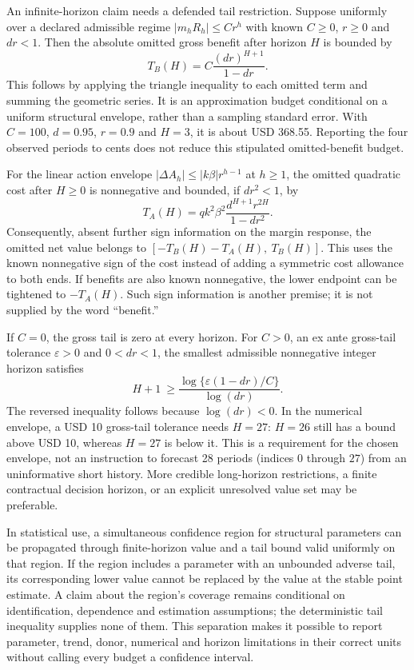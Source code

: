 An infinite-horizon claim needs a defended tail restriction. Suppose
uniformly over a declared admissible regime
$|m_hR_h|\leq C r^h$ with known $C\geq0$, $r\geq0$ and $dr<1$.
Then the absolute omitted gross benefit after horizon $H$ is bounded by
\begin{equation}
 T_B(H)=C\frac{(dr)^{H+1}}{1-dr}.
 \label{exec17:s6-tail-budget}
\end{equation}
This follows by applying the triangle inequality to each omitted term
and summing the geometric series. It is an approximation budget
conditional on a uniform structural envelope, rather than a sampling
standard error. With $C=100$, $d=0.95$, $r=0.9$ and $H=3$, it is
about USD 368.55. Reporting the four observed periods to cents does
not reduce this stipulated omitted-benefit budget.

For the linear action envelope
$|\Delta A_h|\leq |k\beta|r^{h-1}$ at $h\geq1$, the omitted
quadratic cost after $H\geq0$ is nonnegative and bounded, if $dr^2<1$,
by
\begin{equation}
 T_A(H)=qk^2\beta^2\frac{d^{H+1}r^{2H}}{1-dr^2}.
 \label{exec17:s6-action-tail}
\end{equation}
Consequently, absent further sign information on the margin response,
the omitted net value belongs to
$[-T_B(H)-T_A(H),\ T_B(H)]$. This uses the known nonnegative
sign of the cost instead of adding a symmetric cost allowance to both
ends. If benefits are also known nonnegative, the lower endpoint can
be tightened to $-T_A(H)$. Such sign information is another premise;
it is not supplied by the word ``benefit.''

If $C=0$, the gross tail is zero at every horizon. For $C>0$, an ex ante
gross-tail tolerance $\varepsilon>0$ and $0<dr<1$,
the smallest admissible nonnegative integer horizon satisfies
\begin{equation}
 H+1\ \geq
 \frac{\log\{\varepsilon(1-dr)/C\}}{\log(dr)}.
 \label{exec17:s6-horizon-budget}
\end{equation}
The reversed inequality follows because $\log(dr)<0$. In the numerical
envelope, a USD 10 gross-tail tolerance needs $H=27$: $H=26$
still has a bound above USD 10, whereas $H=27$ is below it.
This is a requirement for the chosen envelope, not an instruction to
forecast 28 periods (indices $0$ through $27$) from an uninformative short history. More credible
long-horizon restrictions, a finite contractual decision horizon, or
an explicit unresolved value set may be preferable.

In statistical use, a simultaneous confidence region for structural
parameters can be propagated through finite-horizon value and a tail
bound valid uniformly on that region. If the region includes a parameter
with an unbounded adverse tail, its corresponding lower value cannot
be replaced by the value at the stable point estimate. A claim about
the region's coverage remains conditional on identification, dependence
and estimation assumptions; the deterministic tail inequality supplies
none of them. This separation makes it possible to report parameter,
trend, donor, numerical and horizon limitations in their correct units
without calling every budget a confidence interval.

